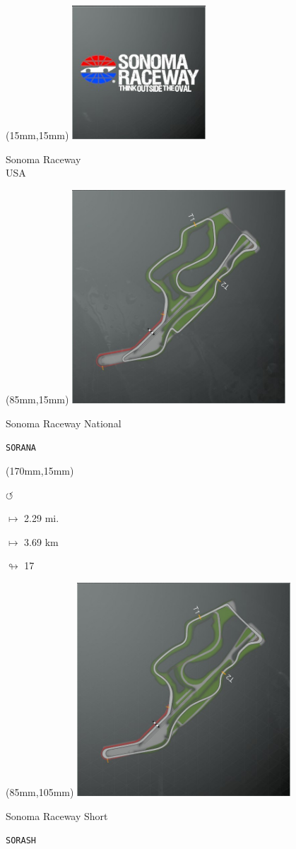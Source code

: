 \begin{textblock*}{60mm}(15mm,15mm)%
\includegraphics[width=50mm]{LG/2015-05-20_00096.png}
\par Sonoma Raceway\\ USA
\end{textblock*}
\begin{textblock*}{80mm}(85mm,15mm)%
\includegraphics[width=80mm]{TR/2015-05-20_00064.png}
\centerline{Sonoma Raceway National}
\par\hfill\tiny\tt SORANA\\
\end{textblock*}
\begin{textblock*}{30mm}(170mm,15mm)%
\par \Huge$\circlearrowleft$
\Large
\par$\mapsto$ 2.29 mi.
\par$\mapsto$ 3.69 km
\par$\looparrowright$ 17
\end{textblock*}
\begin{textblock*}{80mm}(85mm,105mm)%
\includegraphics[width=80mm]{TR/2015-05-20_00063.png}
\centerline{Sonoma Raceway Short}
\par\hfill\tiny\tt SORASH\\
\end{textblock*}
